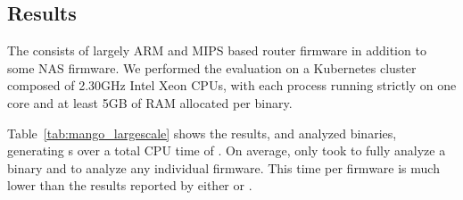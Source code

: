 \subsection{\largeScaleDataset Results}



The \largeScaleDataset consists of largely ARM and MIPS based router firmware in addition to some NAS firmware.
We performed the evaluation on a Kubernetes cluster composed of 2.30GHz Intel Xeon CPUs, with each process running strictly on one core and at least 5GB of RAM allocated per binary.

Table~\ref{tab:mango_largescale} shows the results, and \mango analyzed \greenhouseTotalTotal binaries, generating \greenhouseTotalAlerts \trupoc{}s over a total CPU time of \greenhouseTotalTime.
On average, \mango only took \greenhouseTotalAVGBinTime to fully analyze a binary and \greenhouseTotalAVGTime to analyze any individual firmware.
This time per firmware is much lower than the results reported by either \satc or \karonte.
